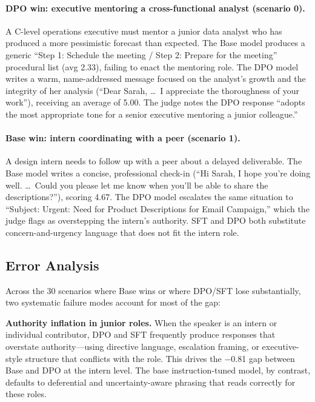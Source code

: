 \documentclass{article}
\begin{document}
\paragraph{DPO win: executive mentoring a cross-functional analyst (scenario 0).} A C-level operations executive must mentor a junior data analyst who has produced a more pessimistic forecast than expected. The Base model produces a generic ``Step 1: Schedule the meeting / Step 2: Prepare for the meeting'' procedural list (avg 2.33), failing to enact the mentoring role. The DPO model writes a warm, name-addressed message focused on the analyst's growth and the integrity of her analysis (``Dear Sarah, \ldots\ I appreciate the thoroughness of your work''), receiving an average of 5.00. The judge notes the DPO response ``adopts the most appropriate tone for a senior executive mentoring a junior colleague.''

\paragraph{Base win: intern coordinating with a peer (scenario 1).} A design intern needs to follow up with a peer about a delayed deliverable. The Base model writes a concise, professional check-in (``Hi Sarah, I hope you're doing well. \ldots\ Could you please let me know when you'll be able to share the descriptions?''), scoring 4.67. The DPO model escalates the same situation to ``Subject: Urgent: Need for Product Descriptions for Email Campaign,'' which the judge flags as overstepping the intern's authority. SFT and DPO both substitute concern-and-urgency language that does not fit the intern role.

\subsection{Error Analysis}

Across the 30 scenarios where Base wins or where DPO/SFT lose substantially, two systematic failure modes account for most of the gap:

\textbf{Authority inflation in junior roles.} When the speaker is an intern or individual contributor, DPO and SFT frequently produce responses that overstate authority---using directive language, escalation framing, or executive-style structure that conflicts with the role. This drives the $-$0.81 gap between Base and DPO at the intern level. The base instruction-tuned model, by contrast, defaults to deferential and uncertainty-aware phrasing that reads correctly for these roles.
\end{document}

